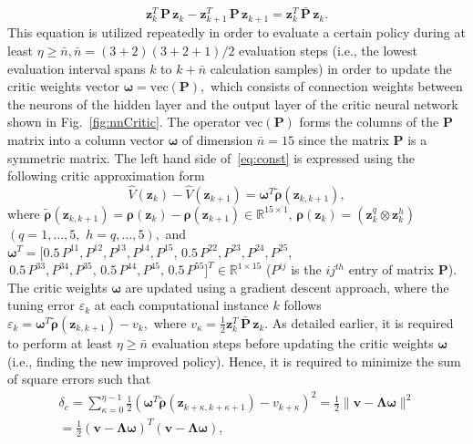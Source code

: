 \documentclass[conference]{IEEEtran}
\begin{document}
 \begin{equation}
 \label{eq:const}
 \mathbf{z}_k^T\, \mathbf{P}\, \mathbf{z}_k - \mathbf{z}_{k+1}^T\, \mathbf{P}\, \mathbf{z}_{k+1} = \mathbf{z}_k^T\, \bar{\mathbf{P}}\, \mathbf{z}_k. 
 \end{equation}
 This equation is utilized repeatedly in order to evaluate a certain policy during at least $\eta\ge \bar n, \bar n= (3+2)(3+2+1)/2$ evaluation steps (i.e., the lowest evaluation interval spans $k$ to $k+\bar n$ calculation samples) in order to update the critic weights vector  $\boldsymbol{\omega}=\mathrm{vec}(\mathbf{P}),$ which consists of connection weights between the neurons of the hidden layer and the output layer of the critic neural network shown in Fig.~\eqref{fig:nnCritic}. The operator $\mathrm{vec}(\mathbf{P})$ forms the columns of the $\mathbf{P}$ matrix into a column vector $\mathbf{\omega}$ of dimension $\bar{n}=15$ since the matrix $\mathbf{P}$ is a symmetric matrix. The left hand side of~\eqref{eq:const} is expressed using the following critic approximation form %
 $$\hat{V}(\mathbf{z}_k)-\hat{V}(\mathbf{z}_{k+1})=\boldsymbol{\omega}^T\tilde{\bm{\rho}}(\mathbf{z}_{k,k+1}),$$
 where $\tilde{\bm{\rho}}(\mathbf{z}_{k,k+1})=\bm{\rho}(\mathbf{z}_k)-\bm{\rho}(\mathbf{z}_{k+1}) \in \mathbb{R}^{15 \times 1}, \, \bm{\rho}(\mathbf{z}_k)=\left(\mathbf{z}^q_k\otimes\mathbf{z}^h_k\right)$ $(q=1,\dots, 5, \,\, h=q,\dots,5),$ and $\boldsymbol{\omega}^T = [0.5 \, P^{11},P^{12},P^{13},P^{14}, P^{15}, \, 0.5 \, P^{22}, P^{23},P^{24},P^{25},$ $\,0.5 \, P^{33}, P^{34},P^{35},\,0.5 \, P^{44},P^{45}, \,0.5 \, P^{55}]^T \in \mathbb{R}^{1\times 15}$ ($P^{ij}$ is the $ij^{th}$ entry of matrix $\mathbf{P}$). %
 The critic weights $\boldsymbol{\omega}$ are updated using a gradient descent approach, where the tuning error $\varepsilon_k$ at each computational instance $k$ follows $\varepsilon_k =\boldsymbol{\omega}^T\tilde{\bm{\rho}}(\mathbf{z}_{k,k+1})-{v}_k,$ where $v_\kappa = \frac{1}{2}\mathbf{z}_{k}^T \, \bar{\mathbf{P}} \, \mathbf{z}_{k}$. As detailed earlier, it is required to perform at least $\eta \ge \bar n$ evaluation steps before updating the critic weights $\boldsymbol{\omega}$ (i.e., finding the new improved policy). Hence, it is required to minimize the sum of square errors such that %
 \begin{multline*}
   \delta_c =\sum_{\kappa=0}^{\eta-1}\frac{1}{2}(\boldsymbol{\omega}^T\tilde{\bm{\rho}}(\mathbf{z}_{k+\kappa,k+\kappa+1})-{v}_{k+\kappa})^2 = \frac{1}{2}\| \mathbf{v} - \bm{\Lambda}\bm{\omega}\|^2\\
   =\frac{1}{2}\left(\mathbf{v} - \bm{\Lambda}\bm{\omega}\right)^T \left(\mathbf{v} - \bm{\Lambda}\bm{\omega}\right), 
 \end{multline*}
\end{document}
